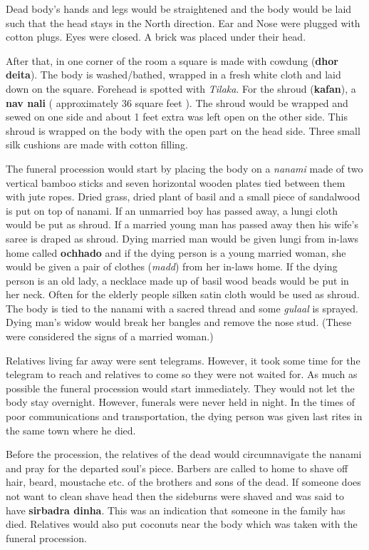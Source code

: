 Dead body's hands and legs would be straightened and the body would be laid
such that the head stays in the North direction. Ear and Nose were plugged with
cotton plugs. Eyes were closed. A brick was placed under their head.

After that, in one corner of the room a square is made with cowdung
(\textbf{dhor deita}). The body is washed/bathed, wrapped in a fresh white
cloth and laid down on the square. Forehead is spotted with \textit{Tilaka}.
For the shroud (\textbf{kafan}), a \textbf{nav nali} ( approximately 36 square
feet ). The shroud would be wrapped and sewed on one side and about 1 feet
extra was left open on the other side. This shroud is wrapped on the body with
the open part on the head side. Three small silk cushions are made with cotton
filling.

The funeral procession would start by placing the body on a \textit{nanami} made
of two vertical bamboo sticks and seven horizontal wooden plates tied between
them with jute ropes. Dried grass, dried plant of basil and a small piece of
sandalwood is put on top of nanami. If an unmarried boy has passed away, a
lungi cloth would be put as shroud. If a married young man has passed away then
his wife's saree is draped as shroud. Dying married man would be given lungi
from in-laws home called \textbf{ochhado} and if the dying person is a young
married woman, she would be given a pair of clothes (\textit{madd}) from her
in-laws home. If the dying person is an old lady, a necklace made up of basil
wood beads would be put in her neck. Often for the elderly people silken satin
cloth would be used as shroud. The body is tied to the nanami with a sacred
thread and some \textit{gulaal} is sprayed. Dying man's widow would break her
bangles and remove the nose stud. (These were considered the signs of a married
woman.)

Relatives living far away were sent telegrams. However, it took some time for
the telegram to reach and relatives to come so they were not waited for. As
much as possible the funeral procession would start immediately. They would not
let the body stay overnight. However, funerals were never held in night. In the
times of poor communications and transportation, the dying person was given
last rites in the same town where he died.

Before the procession, the relatives of the dead would circumnavigate the
nanami and pray for the departed soul's piece. Barbers are called to home to
shave off hair, beard, moustache etc. of the brothers and sons of the dead. If
someone does not want to clean shave head then the sideburns were shaved and
was said to have \textbf{sirbadra dinha}. This was an indication that someone
in the family has died. Relatives would also put coconuts near the body which
was taken with the funeral procession.


